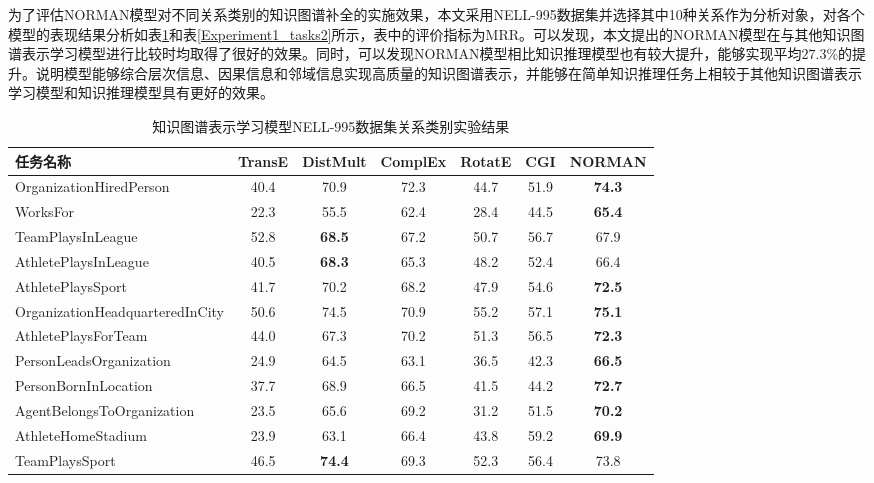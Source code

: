 \documentclass[algorithmlist, AutoFakeBold, AutoFakeSlant, figurelist, tablelist, nomlist, engineering]{seuthesix}
\begin{document}
为了评估NORMAN模型对不同关系类别的知识图谱补全的实施效果，本文采用NELL-995数据集并选择其中10种关系作为分析对象，对各个模型的表现结果分析如表\ref{Experiment1_tasks1}和表\ref{Experiment1_tasks2}所示，表中的评价指标为MRR。可以发现，本文提出的NORMAN模型在与其他知识图谱表示学习模型进行比较时均取得了很好的效果。同时，可以发现NORMAN模型相比知识推理模型也有较大提升，能够实现平均$27.3\%$的提升。说明模型能够综合层次信息、因果信息和邻域信息实现高质量的知识图谱表示，并能够在简单知识推理任务上相较于其他知识图谱表示学习模型和知识推理模型具有更好的效果。
\begin{table}[]
  \centering
  \begin{tabular*}{0.95\textwidth}{@{\extracolsep{\fill}}lcccccc}
  \toprule[1pt]
  \small{任务名称} & \small{TransE} & \small{DistMult} & \small{ComplEx} & \small{RotatE} & \small{CGI} & \small{NORMAN} \\ \hline
  \small{OrganizationHiredPerson} & 40.4 & 70.9 & 72.3 & 44.7 & 51.9 & \textbf{74.3} \\
  \small{WorksFor} & 22.3 & 55.5 & 62.4 & 28.4 & 44.5 & \textbf{65.4} \\
  \small{TeamPlaysInLeague} & 52.8 & \textbf{68.5} & 67.2 & 50.7 & 56.7 & 67.9 \\
  \small{AthletePlaysInLeague} & 40.5 & \textbf{68.3} & 65.3 & 48.2 & 52.4 & 66.4 \\
  \small{AthletePlaysSport} & 41.7 & 70.2 & 68.2 & 47.9 & 54.6 & \textbf{72.5} \\
  \small{OrganizationHeadquarteredInCity} & 50.6 & 74.5 & 70.9 & 55.2 & 57.1 & \textbf{75.1} \\
  \small{AthletePlaysForTeam} & 44.0 & 67.3 & 70.2 & 51.3 & 56.5 & \textbf{72.3} \\
  \small{PersonLeadsOrganization} & 24.9 & 64.5 & 63.1 & 36.5 & 42.3 & \textbf{66.5} \\
  \small{PersonBornInLocation} & 37.7 & 68.9 & 66.5 & 41.5 & 44.2 & \textbf{72.7} \\
  \small{AgentBelongsToOrganization} & 23.5 & 65.6 & 69.2 & 31.2 & 51.5 & \textbf{70.2} \\
  \small{AthleteHomeStadium} & 23.9 & 63.1 & 66.4 & 43.8 & 59.2 & \textbf{69.9} \\
  \small{TeamPlaysSport} & 46.5 & \textbf{74.4} & 69.3 & 52.3 & 56.4 & 73.8 \\
  \bottomrule[1pt]
  \end{tabular*}
  \caption{知识图谱表示学习模型NELL-995数据集关系类别实验结果}
  \label{Experiment1_tasks1}
\end{table}
\end{document}
